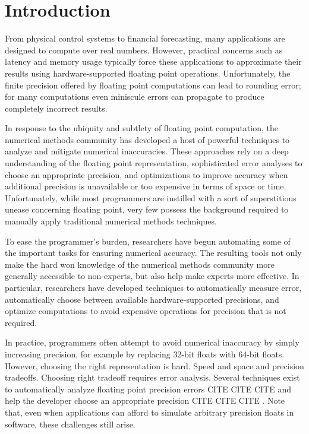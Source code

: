 \documentclass[paper.tex]{subfiles}
\begin{document}
\section{Introduction}
\label{sec:intro}

From physical control systems to financial forecasting, many
applications are designed to compute over real numbers.  However,
practical concerns such as latency and memory usage typically force
these applications to approximate their results using
hardware-supported floating point operations.  Unfortunately, the
finite precision offered by floating point computations can lead to
rounding error; for many computations even miniscule errors can
propagate to produce completely incorrect results.

In response to the ubiquity and subtlety of floating point
computation, the numerical methods community has developed a host of
powerful techniques to analyze and mitigate numerical inaccuracies.
These approaches rely on a deep understanding of the floating point
representation, sophisticated error analyses to choose an appropriate
precision, and optimizations to improve accuracy when additional
precision is unavailable or too expensive in terms of space or time.
Unfortunately, while most programmers are instilled with a sort of
superstitious unease concerning floating point, very few possess the
background required to manually apply traditional numerical methods
techniques. 

To ease the programmer's burden, researchers have begun automating
some of the important tasks for ensuring numerical accuracy.  The
resulting tools not only make the hard won knowledge of the numerical
methods community more generally accessible to non-experts, but also
help make experts more effective.  In particular, researchers have
developed techniques to automatically measure error, automatically
choose between available hardware-supported precisions, and optimize
computations to avoid expensive operations for precision that is not
required.

In practice, programmers often attempt to avoid numerical inaccuracy
by simply increasing precision, for example by replacing 32-bit floats
with 64-bit floats.  However, choosing the right representation is
hard.  Speed and space and precision tradeoffs.  Choosing right
tradeoff requires error analysis.  Several techniques exist to
automatically analyze floating point precision errors CITE CITE CITE
and help the developer choose an appropriate precision CITE CITE CITE
.  Note that, even when applications can afford to simulate
arbitrary precision floats in software, these challenges still arise.
\end{document}

